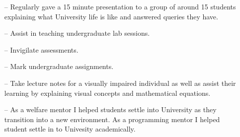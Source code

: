 \documentclass[]{deedy-resume-openfont}
\begin{document}
\begin{minipage}[t]{0.66\textwidth}
\begin{enumerate}[leftmargin=0.4cm, itemsep=-0.3ex, topsep=0pt]
\item[--] Regularly gave a 15 minute presentation to a group of around 15 students explaining what University life is like and answered queries they have.
\end{enumerate}
\sectionsep

\begin{enumerate}[leftmargin=0.4cm, itemsep=-0.3ex, topsep=0pt]
\item[--] Assist in teaching undergraduate lab sessions.
\item[--] Invigilate assessments.
\item[--] Mark undergraduate assignments.
\end{enumerate}
\sectionsep

\begin{enumerate}[leftmargin=0.4cm, itemsep=-0.3ex, topsep=0pt]
\item[--] Take lecture notes for a visually impaired individual as well as assist their learning by explaining visual concepts and mathematical equations.
\end{enumerate}
\sectionsep

\begin{enumerate}[lefftmargin=0.4cm, itemsep=-0.3ex, topsep=0pt]
\item[--] As a welfare mentor I helped students settle into University as they transition into a new environment. As a programming mentor I helped student settle in to Univesity academically.
\end{enumerate}
\sectionsep



\end{minipage}
\end{document}
